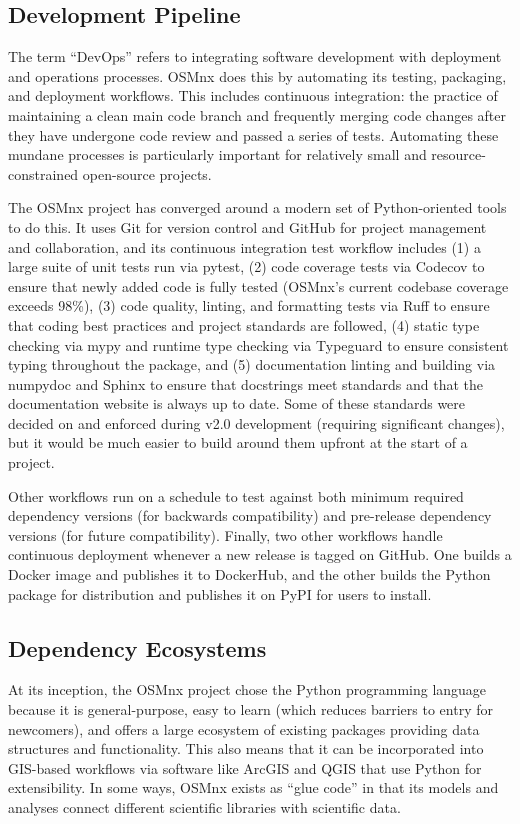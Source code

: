 \documentclass[12pt,letterpaper]{article} %
\begin{document}
\subsection{Development Pipeline}

The term \enquote{DevOps} refers to integrating software development with deployment and operations processes. OSMnx does this by automating its testing, packaging, and deployment workflows. This includes continuous integration: the practice of maintaining a clean main code branch and frequently merging code changes after they have undergone code review and passed a series of tests. Automating these mundane processes is particularly important for relatively small and resource-constrained open-source projects.

The OSMnx project has converged around a modern set of Python-oriented tools to do this. It uses Git for version control and GitHub for project management and collaboration, and its continuous integration test workflow includes (1) a large suite of unit tests run via pytest, (2) code coverage tests via Codecov to ensure that newly added code is fully tested (OSMnx's current codebase coverage exceeds 98\%), (3) code quality, linting, and formatting tests via Ruff to ensure that coding best practices and project standards are followed, (4) static type checking via mypy and runtime type checking via Typeguard to ensure consistent typing throughout the package, and (5) documentation linting and building via numpydoc and Sphinx to ensure that docstrings meet standards and that the documentation website is always up to date. Some of these standards were decided on and enforced during v2.0 development (requiring significant changes), but it would be much easier to build around them upfront at the start of a project.

Other workflows run on a schedule to test against both minimum required dependency versions (for backwards compatibility) and pre-release dependency versions (for future compatibility). Finally, two other workflows handle continuous deployment whenever a new release is tagged on GitHub. One builds a Docker image and publishes it to DockerHub, and the other builds the Python package for distribution and publishes it on PyPI for users to install.

\subsection{Dependency Ecosystems}

At its inception, the OSMnx project chose the Python programming language because it is general-purpose, easy to learn (which reduces barriers to entry for newcomers), and offers a large ecosystem of existing packages providing data structures and functionality. This also means that it can be incorporated into GIS-based workflows via software like ArcGIS and QGIS that use Python for extensibility. In some ways, OSMnx exists as \enquote{glue code} in that its models and analyses connect different scientific libraries with scientific data.
\end{document}
